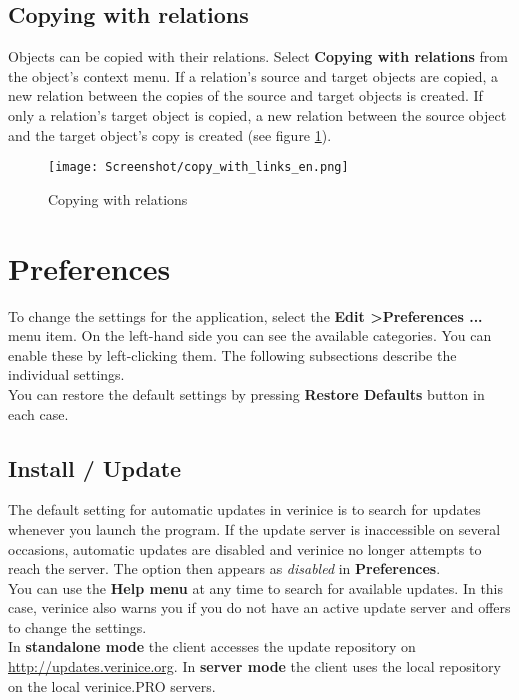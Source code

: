 \documentclass[a4paper,10pt]{book}
\begin{document}
\newpage
\section{Copying with relations}
Objects can be copied with their relations. Select \textbf{Copying with relations} from the object's context menu.
If a relation's source and target objects are copied, a new relation between the copies of the source and target objects is created. If only a relation's target object is copied, a new relation between the source object and the target object's copy is created (see figure \ref{Copying with relations}).
\begin{figure}[htb!]
  \centering
  \texttt{[image: Screenshot/copy\_with\_links\_en.png]}
  \caption{\label{Copying with relations} Copying with relations}
\end{figure}

\chapter{Preferences}
To change the settings for the application, select the
\textbf{Edit \textgreater Preferences ...} menu item. On the left-hand side you can see the available categories. You can enable these by
left-clicking them. The following subsections describe the individual settings.
\newline\\
You can restore the default settings by pressing \textbf{Restore Defaults} button in each case.

\section{Install / Update} \label{Install / Update}
The default setting for automatic updates in verinice is to search for updates whenever you launch the program.
If the update server is inaccessible on several occasions, automatic updates are disabled and verinice no longer
attempts to reach the server. The option then appears as {\em disabled} in \textbf{Preferences}.
\newline\\
You can use the \textbf{Help menu} at any time to search for available updates. In this case, verinice also warns you if you do not
have an active update server and offers to change the settings.
\newline\\
In \textbf{standalone mode} the client accesses the update repository on
\newline \href{http://updates.verinice.org}{http://updates.verinice.org}.
In \textbf{server mode} the client uses the local repository on the local verinice.\textsc{PRO} servers.
\end{document}
